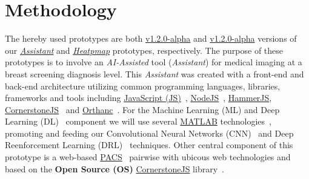 
\section{Methodology}
\label{sec:sec003}

The hereby used prototypes are both \hyperlink{https://github.com/mida-project/prototype-multi-modality-assistant/releases/tag/v1.2.0-alpha}{v1.2.0-alpha} and \hyperlink{https://github.com/mida-project/prototype-heatmap/releases/tag/v1.2.0-alpha}{v1.2.0-alpha} versions of our {\it \hyperlink{https://github.com/mida-project/prototype-multi-modality-assistant/}{Assistant}} and {\it \hyperlink{https://github.com/mida-project/prototype-heatmap}{Heatpmap}} prototypes, respectively. The purpose of these prototypes is to involve an \textit{AI-Assisted} tool (\textit{Assistant}) for medical imaging at a breast screening diagnosis level. This \textit{Assistant} was created with a front-end and back-end architecture utilizing common programming languages, libraries, frameworks and tools including \hyperlink{https://www.javascript.com/}{JavaScript (JS)}~\cite{flanagan2006javascript}, \hyperlink{https://nodejs.org/}{NodeJS}~\cite{wilson2018node}, \hyperlink{https://hammerjs.github.io/}{HammerJS}, \hyperlink{https://cornerstonejs.org/}{CornerstoneJS}~\cite{hostetter2018integration} and \hyperlink{https://www.orthanc-server.com/}{Orthanc}~\cite{Jodogne:ISBI2013}. For the Machine Learning (ML) and Deep Learning (DL)~\cite{ribeiro2017real, ribeiro2016real} component we will use several \hyperlink{https://www.mathworks.com/products/matlab.html}{MATLAB} technologies~\cite{vedaldi2015matconvnet}, promoting and feeding our Convolutional Neural Networks (CNN)~\cite{carneiro2015unregistered} and Deep Reenforcement Learning (DRL)~\cite{maicas2017deep} techniques. Other central component of this prototype is a web-based \hyperlink{https://www.sciencedirect.com/topics/medicine-and-dentistry/picture-archiving-and-communication-system}{PACS}~\cite{cooke2003picture} pairwise with ubicous web technologies and based on the \textbf{Open Source (OS)} \hyperlink{https://cornerstonejs.org/}{CornerstoneJS} library~\cite{feller2002understanding, hostetter2018integration}.


